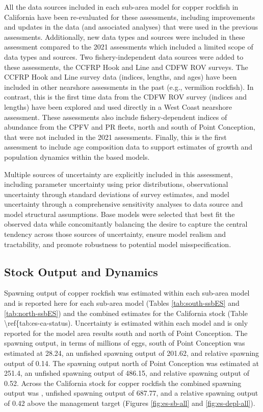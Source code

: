 \documentclass[11pt,
  english,
  letterpaper,
]{article}
\begin{document}
All the data sources included in each sub-area model for copper rockfish in California have been re-evaluated for these assessments, including improvements and updates in the data (and associated analyses) that were used in the previous assessments. Additionally, new data types and sources were included in these assessment compared to the 2021 assessments which included a limited scope of data types and sources. Two fishery-independent data sources were added to these assessments, the CCFRP Hook and Line and CDFW ROV surveys. The CCFRP Hook and Line survey data (indices, lengths, and ages) have been included in other nearshore assessments in the past (e.g., vermilion rockfish). In contrast, this is the first time data from the CDFW ROV survey (indices and lengths) have been explored and used directly in a West Coast nearshore assessment. These assessments also include fishery-dependent indices of abundance from the CPFV and PR fleets, north and south of Point Conception, that were not included in the 2021 assessments. Finally, this is the first assessment to include age composition data to support estimates of growth and population dynamics within the based models.

Multiple sources of uncertainty are explicitly included in this assessment, including parameter uncertainty using prior distributions, observational uncertainty through standard deviations of survey estimates, and model uncertainty through a comprehensive sensitivity analyses to data source and model structural assumptions. Base models were selected that best fit the observed data while concomitantly balancing the desire to capture the central tendency across those sources of uncertainty, ensure model realism and tractability, and promote robustness to potential model misspecification.

\hypertarget{stock-output-and-dynamics}{%
\subsection*{Stock Output and Dynamics}\label{stock-output-and-dynamics}}

Spawning output of copper rockfish was estimated within each sub-area model and is reported here for each sub-area model (Tables \ref{tab:south-ssbES} and \ref{tab:north-ssbES}) and the combined estimates for the California stock (Table \textbackslash ref\{tab:es-ca-status). Uncertainty is estimated within each model and is only reported for the model area results south and north of Point Conception. The spawning output, in terms of millions of eggs, south of Point Conception was estimated at 28.24, an unfished spawning output of 201.62, and relative spawning output of 0.14. The spawning output north of Point Conception was estimated at 251.4, an unfished spawning output of 486.15, and relative spawning output of 0.52. Across the California stock for copper rockfish the combined spawning output was , unfished spawning output of 687.77, and a relative spawning output of 0.42 above the management target (Figures \ref{fig:es-sb-all} and \ref{fig:es-depl-all}).
\end{document}
